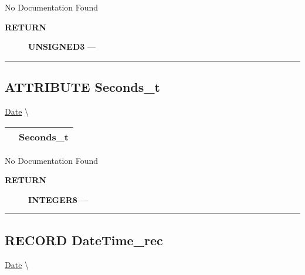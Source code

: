 No Documentation Found








\par
\begin{description}
\item [\colorbox{tagtype}{\color{white} \textbf{\textsf{RETURN}}}] \textbf{UNSIGNED3} --- 
\end{description}




\rule{\linewidth}{0.5pt}
\subsection*{\textsf{\colorbox{headtoc}{\color{white} ATTRIBUTE}
Seconds\_t}}

\hypertarget{ecldoc:date.seconds_t}{}
\hspace{0pt} \hyperlink{ecldoc:Date}{Date} \textbackslash 

{\renewcommand{\arraystretch}{1.5}
\begin{tabularx}{\textwidth}{|>{\raggedright\arraybackslash}l|X|}
\hline
\hspace{0pt}\mytexttt{\color{red} } & \textbf{Seconds\_t} \\
\hline
\end{tabularx}
}

\par





No Documentation Found








\par
\begin{description}
\item [\colorbox{tagtype}{\color{white} \textbf{\textsf{RETURN}}}] \textbf{INTEGER8} --- 
\end{description}




\rule{\linewidth}{0.5pt}
\subsection*{\textsf{\colorbox{headtoc}{\color{white} RECORD}
DateTime\_rec}}

\hypertarget{ecldoc:date.datetime_rec}{}
\hspace{0pt} \hyperlink{ecldoc:Date}{Date} \textbackslash 

